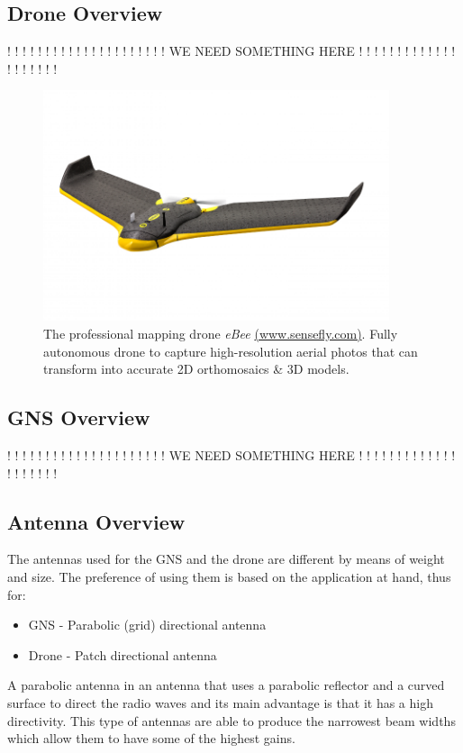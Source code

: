 \subsection{Drone Overview}
			! !	! ! ! ! ! ! ! ! ! ! ! !
! ! ! ! ! ! ! WE NEED SOMETHING HERE ! ! ! ! ! !
			! ! ! ! ! ! ! ! ! ! ! ! ! !

\begin{figure}[H]
  \centering
  \includegraphics[width=4in]{figures/eBee.png}
  \caption[The professional mapping drone eBee]
   {The professional mapping drone \textit{eBee} \href{https://www.sensefly.com/drones/ebee.html}{(www.sensefly.com)}. Fully autonomous drone to capture high-resolution aerial photos that can transform into accurate 2D orthomosaics \& 3D models.}
\end{figure}

\subsection{GNS Overview}
			! !	! ! ! ! ! ! ! ! ! ! ! !
! ! ! ! ! ! ! WE NEED SOMETHING HERE ! ! ! ! ! !
			! ! ! ! ! ! ! ! ! ! ! ! ! !

\subsection{Antenna Overview}
The antennas used for the GNS and the drone are different by means of weight and size. The preference of using them is based on the application at hand, thus for:
\begin{itemize}
	\item GNS - Parabolic (grid) directional antenna 
	\item Drone - Patch directional antenna
\end{itemize}

A parabolic antenna in an antenna that uses a parabolic reflector and a curved surface to direct the radio waves and its main advantage is that it has a high directivity. This type of antennas are able to produce the narrowest beam widths which allow them to have some of the highest gains.

